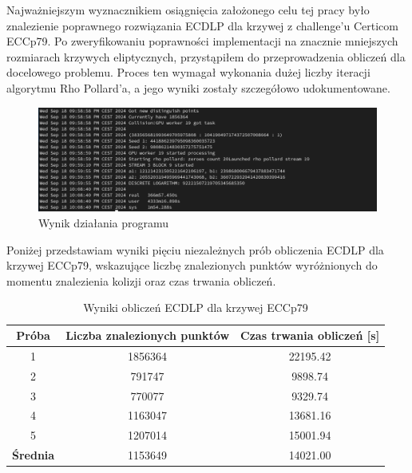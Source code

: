 Najważniejszym wyznacznikiem osiągnięcia założonego celu tej pracy było
znalezienie poprawnego rozwiązania ECDLP dla krzywej z challenge'u Certicom ECCp79.
Po zweryfikowaniu poprawności implementacji na znacznie mniejszych rozmiarach
krzywych eliptycznych, przystąpiłem do przeprowadzenia obliczeń dla docelowego
problemu. Proces ten wymagał wykonania dużej liczby iteracji algorytmu Rho Pollard'a,
a jego wyniki zostały szczegółowo udokumentowane.
\begin{figure}[H]
    \centering
    \includegraphics[width=1\textwidth]{img/first_attempt.png}
    \caption{Wynik działania programu}
    \label{fig:first_attempt}
\end{figure}

Poniżej przedstawiam wyniki pięciu niezależnych prób obliczenia ECDLP dla
krzywej ECCp79, wskazujące liczbę znalezionych punktów wyróżnionych do momentu
znalezienia kolizji oraz czas trwania obliczeń.
\begin{table}[H]
    \centering
    \caption{Wyniki obliczeń ECDLP dla krzywej ECCp79}
    \label{tab:eccp79_results}
    \begin{tabular}{|c|c|c|}
        \hline
        \textbf{Próba}   & \textbf{Liczba znalezionych punktów} &
        \textbf{Czas trwania obliczeń [s]}                                      \\ \hline
        1                & 1856364                             & 22195.42      \\ \hline
        2                & 791747                              & 9898.74       \\ \hline
        3                & 770077                              & 9329.74       \\ \hline
        4                & 1163047                             & 13681.16      \\ \hline
        5                & 1207014                             & 15001.94      \\ \hline
        \textbf{Średnia} & 1153649                             & 14021.00      \\ \hline
    \end{tabular}
\end{table}



